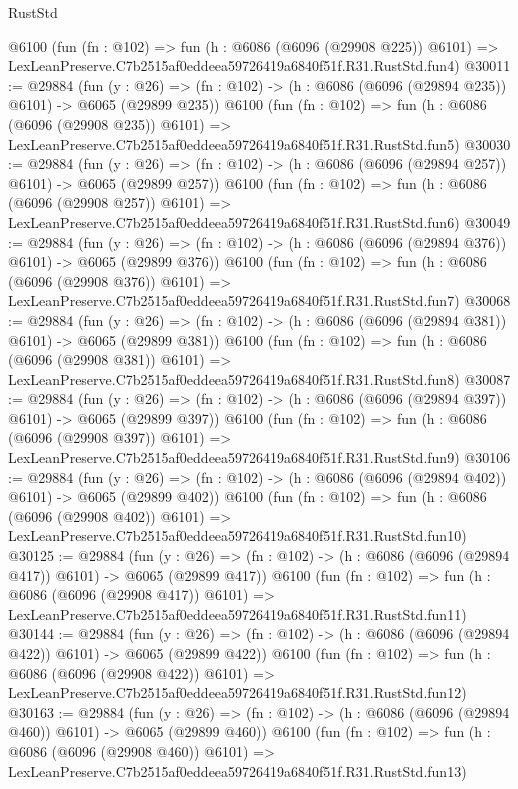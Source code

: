 \begin{lexlean}{RustStd}
\begin{coremodule}
    @6100
    (fun (fn : @102) =>
    fun (h : @6086 (@6096 (@29908 @225)) @6101) =>
    LexLeanPreserve.C7b2515af0eddeea59726419a6840f51f.R31.RustStd.fun4)
@30011 := @29884
    (fun (y : @26) => (fn : @102) -> (h : @6086 (@6096 (@29894 @235)) @6101) -> @6065 (@29899 @235))
    @6100
    (fun (fn : @102) =>
    fun (h : @6086 (@6096 (@29908 @235)) @6101) =>
    LexLeanPreserve.C7b2515af0eddeea59726419a6840f51f.R31.RustStd.fun5)
@30030 := @29884
    (fun (y : @26) => (fn : @102) -> (h : @6086 (@6096 (@29894 @257)) @6101) -> @6065 (@29899 @257))
    @6100
    (fun (fn : @102) =>
    fun (h : @6086 (@6096 (@29908 @257)) @6101) =>
    LexLeanPreserve.C7b2515af0eddeea59726419a6840f51f.R31.RustStd.fun6)
@30049 := @29884
    (fun (y : @26) => (fn : @102) -> (h : @6086 (@6096 (@29894 @376)) @6101) -> @6065 (@29899 @376))
    @6100
    (fun (fn : @102) =>
    fun (h : @6086 (@6096 (@29908 @376)) @6101) =>
    LexLeanPreserve.C7b2515af0eddeea59726419a6840f51f.R31.RustStd.fun7)
@30068 := @29884
    (fun (y : @26) => (fn : @102) -> (h : @6086 (@6096 (@29894 @381)) @6101) -> @6065 (@29899 @381))
    @6100
    (fun (fn : @102) =>
    fun (h : @6086 (@6096 (@29908 @381)) @6101) =>
    LexLeanPreserve.C7b2515af0eddeea59726419a6840f51f.R31.RustStd.fun8)
@30087 := @29884
    (fun (y : @26) => (fn : @102) -> (h : @6086 (@6096 (@29894 @397)) @6101) -> @6065 (@29899 @397))
    @6100
    (fun (fn : @102) =>
    fun (h : @6086 (@6096 (@29908 @397)) @6101) =>
    LexLeanPreserve.C7b2515af0eddeea59726419a6840f51f.R31.RustStd.fun9)
@30106 := @29884
    (fun (y : @26) => (fn : @102) -> (h : @6086 (@6096 (@29894 @402)) @6101) -> @6065 (@29899 @402))
    @6100
    (fun (fn : @102) =>
    fun (h : @6086 (@6096 (@29908 @402)) @6101) =>
    LexLeanPreserve.C7b2515af0eddeea59726419a6840f51f.R31.RustStd.fun10)
@30125 := @29884
    (fun (y : @26) => (fn : @102) -> (h : @6086 (@6096 (@29894 @417)) @6101) -> @6065 (@29899 @417))
    @6100
    (fun (fn : @102) =>
    fun (h : @6086 (@6096 (@29908 @417)) @6101) =>
    LexLeanPreserve.C7b2515af0eddeea59726419a6840f51f.R31.RustStd.fun11)
@30144 := @29884
    (fun (y : @26) => (fn : @102) -> (h : @6086 (@6096 (@29894 @422)) @6101) -> @6065 (@29899 @422))
    @6100
    (fun (fn : @102) =>
    fun (h : @6086 (@6096 (@29908 @422)) @6101) =>
    LexLeanPreserve.C7b2515af0eddeea59726419a6840f51f.R31.RustStd.fun12)
@30163 := @29884
    (fun (y : @26) => (fn : @102) -> (h : @6086 (@6096 (@29894 @460)) @6101) -> @6065 (@29899 @460))
    @6100
    (fun (fn : @102) =>
    fun (h : @6086 (@6096 (@29908 @460)) @6101) =>
    LexLeanPreserve.C7b2515af0eddeea59726419a6840f51f.R31.RustStd.fun13)

\end{coremodule}
\end{lexlean}
